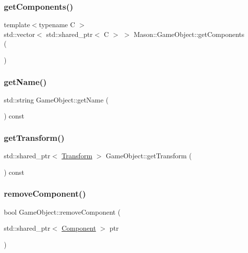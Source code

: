 \subsubsection{\texorpdfstring{get\+Components()}{getComponents()}}
{\footnotesize\ttfamily template$<$typename C $>$ \\
std\+::vector$<$ std\+::shared\+\_\+ptr$<$ C $>$ $>$ Mason\+::\+Game\+Object\+::get\+Components (\begin{DoxyParamCaption}{ }\end{DoxyParamCaption})}

\hypertarget{class_mason_1_1_game_object_a7b5b5ca6b3754cdfb175cd1938c77f10}{}\label{class_mason_1_1_game_object_a7b5b5ca6b3754cdfb175cd1938c77f10} 
\subsubsection{\texorpdfstring{get\+Name()}{getName()}}
{\footnotesize\ttfamily std\+::string Game\+Object\+::get\+Name (\begin{DoxyParamCaption}{ }\end{DoxyParamCaption}) const}

\hypertarget{class_mason_1_1_game_object_af1eeaf1920ea84b369cfa9bfd69754df}{}\label{class_mason_1_1_game_object_af1eeaf1920ea84b369cfa9bfd69754df} 
\subsubsection{\texorpdfstring{get\+Transform()}{getTransform()}}
{\footnotesize\ttfamily std\+::shared\+\_\+ptr$<$ \hyperlink{class_mason_1_1_transform}{Transform} $>$ Game\+Object\+::get\+Transform (\begin{DoxyParamCaption}{ }\end{DoxyParamCaption}) const}

\hypertarget{class_mason_1_1_game_object_af22f654507a0f6a5056c0d99bc6cd1b8}{}\label{class_mason_1_1_game_object_af22f654507a0f6a5056c0d99bc6cd1b8} 
\subsubsection{\texorpdfstring{remove\+Component()}{removeComponent()}}
{\footnotesize\ttfamily bool Game\+Object\+::remove\+Component (\begin{DoxyParamCaption}\item[{std\+::shared\+\_\+ptr$<$ \hyperlink{class_mason_1_1_component}{Component} $>$}]{ptr }\end{DoxyParamCaption})}

